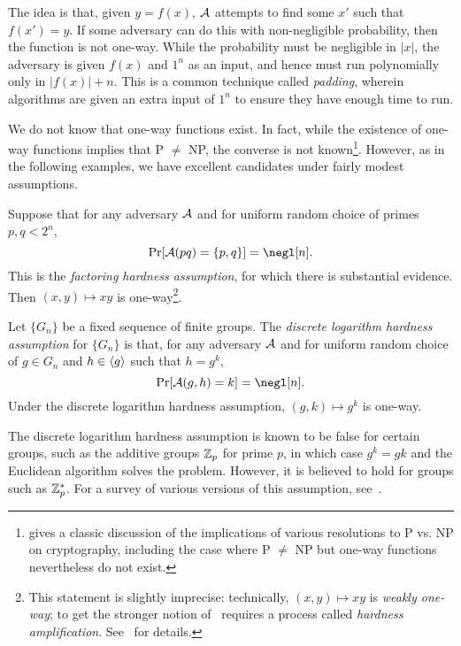 The idea is that, given $y = f(x)$, $\mathcal{A}$ attempts to find some $x'$ such that
$f(x') = y$. If some adversary can do this with non-negligible probability, then the
function is not one-way. While the probability must be negligible in $|x|$, the
adversary is given $f(x)$ and $1^n$ as an input, and hence must run polynomially
only in $|f(x)| + n$. This is a common technique called \emph{padding}, wherein
algorithms are given an extra input of $1^n$ to ensure they have enough time to
run.

We do not know that one-way functions exist. In fact, while the existence of
one-way functions implies that P $\neq$ NP, the converse is not
known\footnote{\cite{impagliazzo-1995} gives a classic discussion of the
  implications of various resolutions to P vs. NP on cryptography, including the
case where P $\neq$ NP but one-way functions nevertheless do not exist.}.
However, as in the following examples, we have excellent candidates under fairly
modest assumptions.

\begin{ex}
  Suppose that for any adversary $\mathcal{A}$ and for uniform random choice of primes
  $p,q<2^n$, \[
    \Pr[\cA(pq) = \{p, q\}] = \negl[n].
  \] This is the \emph{factoring hardness assumption}, for which there is
  substantial evidence. Then $(x,y)\mapsto xy$ is one-way\footnote{This
    statement is slightly imprecise: technically, $(x,y)\mapsto xy$ is \emph{weakly
    one-way}; to get the stronger notion of~
    requires a process called \emph{hardness
    amplification}. See~\cite[Section 2.4]{pass-shelat-2020}
for details.}.
\end{ex}

\begin{ex}
  Let $\{G_n\}$ be a fixed sequence of finite groups. The \emph{discrete logarithm hardness assumption}
  for $\{G_n\}$ is that, for any adversary $\mathcal{A}$ and for uniform random choice of
  $g\in G_n$ and $h\in\langle g\rangle$ such that $h = g^k$, \[
    \Pr[\cA(g,h) = k] = \negl[n].
  \]
  Under the discrete logarithm hardness assumption, $(g,k)\mapsto g^k$ is one-way.

  The discrete logarithm hardness assumption is known to be false for certain groups, such
  as the additive groups $\mathbb{Z}_p$ for prime $p$, in which case $g^k = gk$ and the
  Euclidean algorithm solves the problem. However, it is believed to hold for
  groups such as $\mathbb{Z}^*_p$. For a survey of various versions of this assumption,
  see~\cite{sadeghi-steinerr-2002}.
\end{ex}

